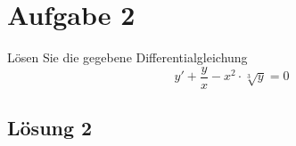 \documentclass[main.tex]{subfiles}
\begin{document}
\section{Aufgabe 2}
Lösen Sie die gegebene Differentialgleichung
\[ 
y' + \frac{y}{x} - x^2 \cdot \sqrt[3]{y} = 0
\]

\subsection{Lösung 2}
\end{document}

